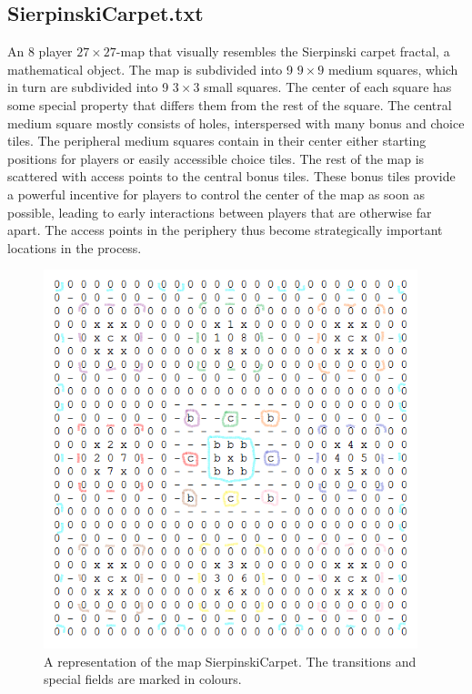 \documentclass[a4paper,12pt]{article}
\begin{document}
\subsection{SierpinskiCarpet.txt}
An 8 player $27\times27$-map that visually resembles the Sierpinski carpet fractal, a mathematical object. The map is subdivided into 9 $9\times9$ medium squares, which in turn are subdivided into 9 $3\times3$ small squares. The center of each square has some special property that differs them from the rest of the square. The central medium square mostly consists of holes, interspersed with many bonus and choice tiles. The peripheral medium squares contain in their center either starting positions for players or easily accessible choice tiles. The rest of the map is scattered with access points to the central bonus tiles. These bonus tiles provide a powerful incentive for players to control the center of the map as soon as possible, leading to early interactions between players that are otherwise far apart. The access points in the periphery thus become strategically important locations in the process.



\begin{figure}[H]
    \centering
    \includegraphics[height=11cm]{pictures/assignment1/SierpinskiCarpet.PNG}
    \caption{A representation of the map SierpinskiCarpet. The transitions and special fields are marked in colours.}
    \label{fig:SierpinskiCarpet}
\end{figure}
\end{document}
